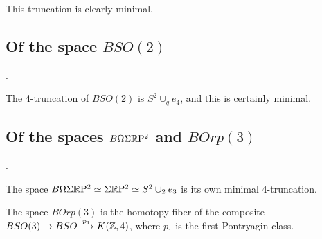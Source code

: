 \documentclass{amsart}
\begin{document}
\nid This truncation is clearly minimal.


\subsection{Of the space $BSO(2)$}.

The 4-truncation of $BSO(2)$ is $S^2 \cup_q e_4$, and this is certainly minimal.

\subsection{Of the spaces $B \Omega \Sigma \mathbb R \mathrm{P}^2$ and $B Orp(3)$}.

The space $B \Omega \Sigma \mathbb R \mathrm{P}^2 \simeq \Sigma \mathbb R \mathrm{P}^2 \simeq S^2 \cup_2 e_3$ is its own minimal 4-truncation.

\begin{definition}
The space $BOrp(3)$ is the homotopy fiber of the composite $BSO(3) \rightarrow BSO \xrightarrow{p_1} K(\mathbb Z,4)$, where $p_1$ is the first Pontryagin class.
\end{definition}
\end{document}
